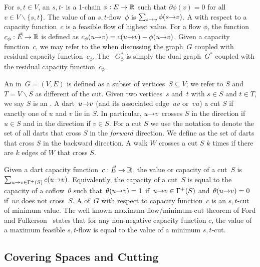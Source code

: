 For $s,t \in V$, an $s,t$- is a 1-chain $\phi: E \to \R$ such that $\partial \phi(v) = 0$ for all $v \in V\backslash \{s,t\}$.
The value of an $s,t$-flow~$\phi$ is $\sum_{s \mathord{\rightarrow} v} \phi(s \mathord{\rightarrow} v)$.
A  with respect to a capacity function~$c$ is a feasible flow of highest value.
For a flow $\phi$, the  function $c_{\phi}: \vec{E} \to \R$ is defined as $c_{\phi}(u \mathord{\rightarrow} v) = c(u \mathord{\rightarrow} v) - \phi(u \mathord{\rightarrow} v)$.
Given a capacity function~$c$, we may refer to the  when discussing the graph~$G$ coupled with residual capacity function~$c_\phi$.
The ~$G^*_{\phi}$ is simply the dual graph~$G^*$ coupled with the residual capacity function~$c_\phi$.

An  in~$G = (V, E)$ is defined as a subset of vertices~$S \subseteq V$; we refer to $S$ and $T = V\backslash S$ as different  of the cut.
Given two vertices~$s$ and~$t$ with $s \in S$ and $t \in T$, we say $S$ is an
.
A dart~$u \mathord{\rightarrow} v$ (and its associated edge~$uv$ or~$vu$)  a cut $S$ if exactly one of $u$ and $v$ lie in $S$.
In particular, $u \mathord{\rightarrow} v$ crosses $S$ in the  direction if $u\in S$ and in the  direction if $v \in S$.
For a cut $S$ we use the notation  to denote the set of all darts that cross $S$ in the \emph{forward} direction.
We define  as the set of darts that cross $S$ in the backward direction.
A walk $W$ crosses a cut $S$ $k$ times if  there are $k$ edges of $W$ that cross $S$.

Given a dart capacity function~$c : \vec{E} \to \R$, the value or capacity of a cut~$S$ is~$\sum_{u \mathord{\rightarrow} v \in \Gamma^+(S)} c(u \mathord{\rightarrow} v)$.
Equivalently, the capacity of a cut~$S$ is equal to the capacity of a coflow~$\theta$ such that~$\theta(u \mathord{\rightarrow} v) = 1$ if~$u \mathord{\rightarrow} v \in \Gamma^+(S)$ and~$\theta(u \mathord{\rightarrow} v) = 0$ if~$uv$ does not cross~$S$.
A  of~$G$ with respect to capacity function~$c$ is an $s,t$-cut of minimum value.
The well known maximum-flow/minimum-cut theorem of Ford and Fulkerson~\cite{ff-mfn-56} states that for any non-negative capacity function $c$, the value of a maximum feasible $s,t$-flow is equal to the value of a minimum $s,t$-cut.


\subsection{Covering Spaces and Cutting}

